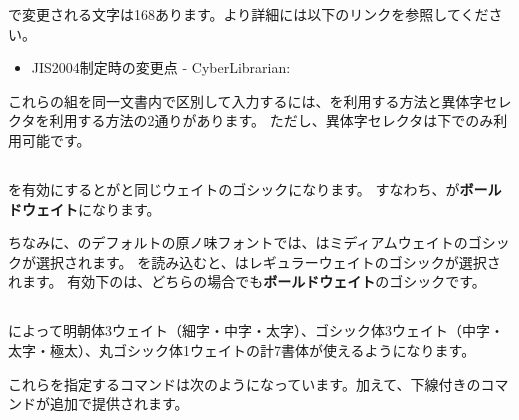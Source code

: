 \documentclass[../otf-unofficial-guide]{subfiles}
\begin{document}
で変更される文字は168あります。より詳細には以下のリンクを参照してください。

\begin{itemize}
  \item JIS2004制定時の変更点 - CyberLibrarian:
\end{itemize}

これらの組を同一文書内で区別して入力するには、を利用する方法と異体字セレクタを利用する方法の2通りがあります。
ただし、異体字セレクタは{\upLaTeXdvipdfmx}下でのみ利用可能です。

\subsection{\texorpdfstring{}{boldオプション}}

を有効にするとがと同じウェイトのゴシックになります。
すなわち、が{\gtfamily\bfseries ボールドウェイト}になります。

ちなみに、{\upLaTeX*}のデフォルトの原ノ味フォントでは、は{\MdGothic ミディアムウェイト}のゴシックが選択されます。
を読み込むと、は{\gtfamily\mdseries レギュラーウェイト}のゴシックが選択されます。
有効下のは、どちらの場合でも{\gtfamily\bfseries ボールドウェイト}のゴシックです。

\subsection{\texorpdfstring{}{deluxeオプション}}

によって明朝体3ウェイト（細字・中字・太字）、ゴシック体3ウェイト（中字・太字・極太）、丸ゴシック体1ウェイトの計7書体が使えるようになります。

これらを指定するコマンドは次のようになっています。加えて、下線付きのコマンドが追加で提供されます。
\end{document}
